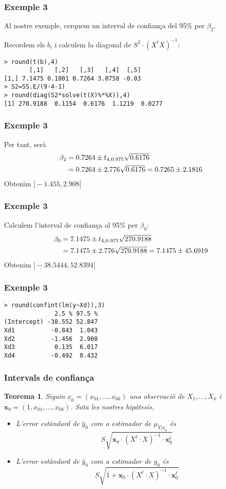\documentclass[12pt,t]{beamer}
\theoremstyle{plain}
\newtheorem{teorema}{Teorema}
\theoremstyle{definition}
\begin{document}
\begin{frame}[fragile]
\frametitle{Exemple 3}
Al nostre exemple, cerquem un interval de confiança del 95\% per $\beta_2$.
\medskip

Recordem els $b_i$ i calculem la diagonal de $S^2\cdot (X^t X)^{-1}$:
\begin{verbatim}
> round(t(b),4)
       [,1]   [,2]   [,3]   [,4]  [,5]
[1,] 7.1475 0.1001 0.7264 3.0758 -0.03
> S2=SS.E/(9-4-1)
> round(diag(S2*solve(t(X)%*%X)),4)
[1] 270.9188  0.1154  0.6176  1.1219  0.0277
\end{verbatim}
\end{frame}


\begin{frame}
\frametitle{Exemple 3}
Per tant, serà
$$
\begin{array}{l}
\beta_2=0.7264\pm t_{4,0.975}\sqrt{0.6176}\\[1ex]
\hphantom{\beta_2} =0.7264\pm 2.776\sqrt{0.6176}=0.7265\pm 2.1816
\end{array}
$$
Obtenim $]-1.455,2.908[$
\end{frame}


\begin{frame}
\frametitle{Exemple 3}
Calculem l'interval de confiança al 95\% per $\beta_0$:\pause
$$
\begin{array}{l}
\beta_0=7.1475\pm t_{4,0.975}\sqrt{270.9188}\\[1ex]
\hphantom{\beta_2} =7.1475\pm 2.776\sqrt{270.9188}=7.1475\pm 45.6919
\end{array}
$$
Obtenim $]-38.5444, 52.8394[$
\end{frame}


\begin{frame}[fragile]
\frametitle{Exemple 3}
\begin{verbatim}
> round(confint(lm(y~Xd)),3)
              2.5 % 97.5 %
(Intercept) -38.552 52.847
Xd1          -0.843  1.043
Xd2          -1.456  2.908
Xd3           0.135  6.017
Xd4          -0.492  0.432
\end{verbatim}

\end{frame}



\begin{frame}
\frametitle{Intervals de confiança}
\begin{teorema}
Siguin $\underline{x}_0=(x_{01},\ldots,x_{0k})$ una observació de $X_1,\ldots,X_k$ i $\mathbf{x}_0=(1,x_{01},\ldots,x_{0k})$. 
Sota les nostres hipòtesis, 
\medskip

\begin{itemize}
\item L'error estàndard de $\widehat{y}_0$ com a estimador de $\mu_{Y|\underline{x}_0}$ és 
$$
S\sqrt{\mathbf{x}_0\cdot  (X^t \cdot  X)^{-1}\cdot \mathbf{x}_0^t}
$$

\item L'error estàndard de $\widehat{y}_0$ com a estimador de $y_0$ és 
$$
S\sqrt{1+\mathbf{x}_0\cdot  (X^t \cdot  X)^{-1}\cdot \mathbf{x}_0^t}
$$
\end{itemize}
\end{teorema}
\end{frame}
\end{document}

